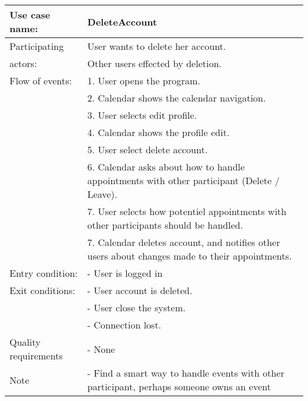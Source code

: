 {\tabulinesep=1.2mm
\begin{tabu}{ | p{3cm} | p{13cm} |}
    \hline
    Use case name: 			& 		DeleteAccount\\ \hline
    Participating  			& 		User wants to delete her account. \\
    actors:					&		Other users effected by deletion.\\ \hline
    Flow of events: 		& 		1. User opens the program. \\
							&		2. Calendar shows the calendar navigation.\\
							&		3. User selects edit profile.\\
							&		4. Calendar shows the profile edit.\\
							&		5. User select delete account.\\
							&		6. Calendar asks about how to handle appointments with other participant (Delete / Leave).\\
							&		7. User selects how potentiel appointments with other participants should be handled. \\
							&		7. Calendar deletes account, and notifies other users about changes made to their appointments. \\\hline
    Entry condition: 		& 		- User is logged in  \\ \hline
	Exit conditions: 		&		- User account is deleted.\\
							&		- User close the system.\\
							&		- Connection lost.\\\hline
	Quality requirements	&	 	- None \\\hline
	Note					&	 	- Find a smart way to handle events with other participant, perhaps someone owns an event \\\hline
\end{tabu}
}